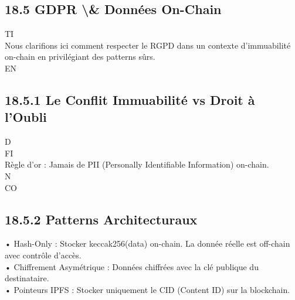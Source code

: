 \subsection{18.5 GDPR \textbackslash{}& Données On-Chain}
\vspace{0.5em}
\vspace{0.5em}
\vspace{0.5em}
\vspace{0.5em}
TI\\
Nous clarifions ici comment respecter le RGPD dans un contexte d’immuabilité on-chain en privilégiant des patterns sûrs.\\
\vspace{0.5em}
\vspace{0.5em}
\vspace{0.5em}
\vspace{0.5em}
EN\\
\subsection{18.5.1 Le Conflit Immuabilité vs Droit à l’Oubli}
\vspace{0.5em}
\vspace{0.5em}
\vspace{0.5em}
\vspace{0.5em}
D\\
FI\\
Règle d’or : Jamais de PII (Personally Identifiable Information) on-chain.\\
\vspace{0.5em}
\vspace{0.5em}
N\\
CO\\
\subsection{18.5.2 Patterns Architecturaux}
• Hash-Only : Stocker keccak256(data) on-chain. La donnée réelle est off-chain avec contrôle d’accès.\\
\vspace{0.5em}
• Chiffrement Asymétrique : Données chiffrées avec la clé publique du destinataire.\\
\vspace{0.5em}
• Pointeurs IPFS : Stocker uniquement le CID (Content ID) sur la blockchain.\\
\vspace{0.5em}
\vspace{0.5em}
